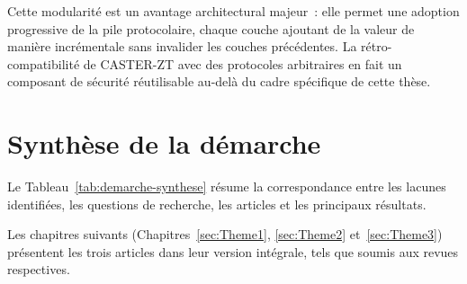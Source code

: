 Cette modularité est un avantage architectural majeur~: elle permet une adoption progressive de la pile protocolaire, chaque couche ajoutant de la valeur de manière incrémentale sans invalider les couches précédentes. La rétro-compatibilité de CASTER-ZT avec des protocoles arbitraires en fait un composant de sécurité réutilisable au-delà du cadre spécifique de cette thèse.


\section{Synthèse de la démarche}

Le Tableau~\ref{tab:demarche-synthese} résume la correspondance entre les lacunes identifiées, les questions de recherche, les articles et les principaux résultats.

\begin{table}[htbp]
\centering
\caption{Synthèse de la démarche de recherche~: des lacunes aux résultats.}
\label{tab:demarche-synthese}
\end{table}

Les chapitres suivants (Chapitres~\ref{sec:Theme1}, \ref{sec:Theme2} et~\ref{sec:Theme3}) présentent les trois articles dans leur version intégrale, tels que soumis aux revues respectives.
